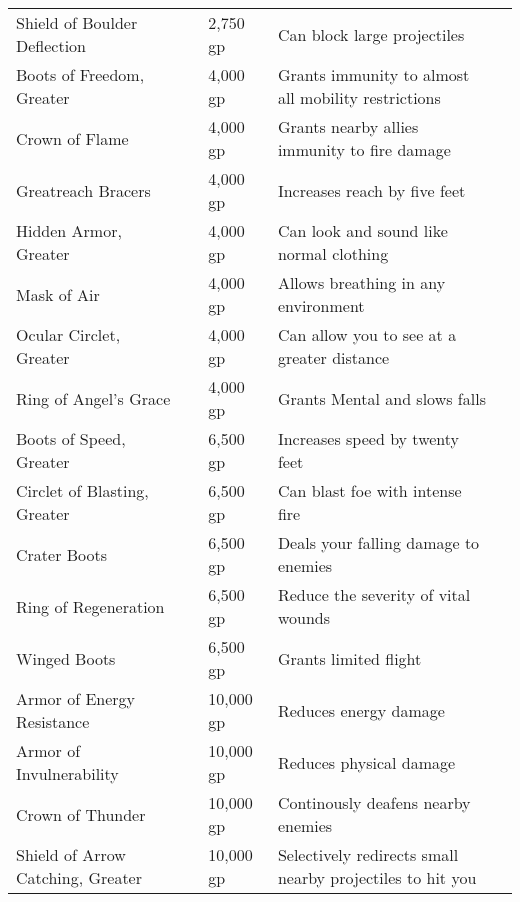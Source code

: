 \begin{longtabuwrapper}
\begin{longtabu}{l l l X l}
Shield of Boulder Deflection &  & 2,750 gp & Can block large projectiles & \pageref{item:Shield of Boulder Deflection} \\
Boots of Freedom, Greater &  & 4,000 gp & Grants immunity to almost all mobility restrictions & \pageref{item:Boots of Freedom, Greater} \\
Crown of Flame &  & 4,000 gp & Grants nearby allies immunity to fire damage & \pageref{item:Crown of Flame} \\
Greatreach Bracers &  & 4,000 gp & Increases reach by five feet & \pageref{item:Greatreach Bracers} \\
Hidden Armor, Greater &  & 4,000 gp & Can look and sound like normal clothing & \pageref{item:Hidden Armor, Greater} \\
Mask of Air &  & 4,000 gp & Allows breathing in any environment & \pageref{item:Mask of Air} \\
Ocular Circlet, Greater &  & 4,000 gp & Can allow you to see at a greater distance & \pageref{item:Ocular Circlet, Greater} \\
Ring of Angel's Grace &  & 4,000 gp & Grants  Mental and slows falls & \pageref{item:Ring of Angel's Grace} \\
Boots of Speed, Greater &  & 6,500 gp & Increases speed by twenty feet & \pageref{item:Boots of Speed, Greater} \\
Circlet of Blasting, Greater &  & 6,500 gp & Can blast foe with intense fire & \pageref{item:Circlet of Blasting, Greater} \\
Crater Boots &  & 6,500 gp & Deals your falling damage to enemies & \pageref{item:Crater Boots} \\
Ring of Regeneration &  & 6,500 gp & Reduce the severity of vital wounds & \pageref{item:Ring of Regeneration} \\
Winged Boots &  & 6,500 gp & Grants limited flight & \pageref{item:Winged Boots} \\
Armor of Energy Resistance &  & 10,000 gp & Reduces energy damage & \pageref{item:Armor of Energy Resistance} \\
Armor of Invulnerability &  & 10,000 gp & Reduces physical damage & \pageref{item:Armor of Invulnerability} \\
Crown of Thunder &  & 10,000 gp & Continously deafens nearby enemies & \pageref{item:Crown of Thunder} \\
Shield of Arrow Catching, Greater &  & 10,000 gp & Selectively redirects small nearby projectiles to hit you & \pageref{item:Shield of Arrow Catching, Greater} \\

\end{longtabu}
\end{longtabuwrapper}
